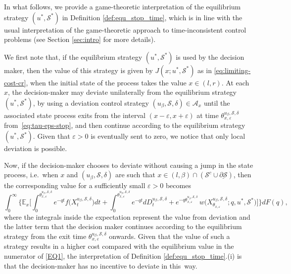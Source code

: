 \documentclass[11pt]{article} %
\numberwithin{komcounter}{section}
\renewcommand{\ul}{\underline}
\renewcommand{\epsilon}{\varepsilon}
\begin{document}
In what follows, we provide a game-theoretic interpretation of the equilibrium strategy $(u^*,\mathcal{S}^*)$ in  Definition \ref{def:equ_stop_time}, which is in line with the usual interpretation of the game-theoretic approach to time-inconsistent control problems (see Section \ref{sec:intro} for more details). 

We first note that, if the equilibrium strategy $(u^*,\mathcal{S}^*)$ is used by the decision maker, then the value of this strategy is given by $J(x; u^*, \mathcal{S}^*)$ as in \eqref{eq:limiting-cost-cr}, when the initial state of the process takes the value $x \in (l,r)$.
At each $x$, the decision-maker may deviate unilaterally from the equilibrium strategy $(u^*,\mathcal{S}^*)$, by  using a deviation control strategy $(u_\beta, \mathcal{S}, \delta)\in \mathcal{A}_{x}$ until the associated state process exits from the interval $(x-\epsilon,x+\epsilon)$ at time $\theta^{u_\beta,\mathcal{S},\delta}_{x,\epsilon}$ from~\eqref{eq:tau-eps-stop}, and then continue according to the equilibrium strategy $(u^*,\mathcal{S}^*)$.
Given that $\epsilon>0$ is eventually sent to zero, we notice that only local deviation is possible. 

Now, if the decision-maker chooses to deviate without causing a jump in the state process, i.e.~when $x$ and $(u_\beta, \mathcal{S}, \delta)$ are such that $x \in (l,\beta) \cap (\mathcal{S}^c \cup \ul{\partial \mathcal{S}})$, then the corresponding value for a sufficiently small $\epsilon>0$ becomes 
$$
\int_0^\infty \bigg\{ 
\mathbb{E}_x \bigg[ \int_{0}^{\theta^{u_\beta,\mathcal{S},\delta}_{x,\epsilon}} e^{-qt} f\big( X_t^{u_\beta,\mathcal{S},\delta} \big) dt + \int_{0}^{\theta^{u_\beta,\mathcal{S},\delta}_{x,\epsilon}} e^{-qt} d D^{u_\beta,\mathcal{S},\delta}_t  + e^{-q \theta^{u_\beta,\mathcal{S},\delta}_{x,\epsilon}} \, w\Big( X^{u_\beta,\mathcal{S},\delta}_{\theta_{x,\epsilon}};q, u^*, \mathcal{S}^* \Big) \bigg] \bigg\} dF(q),
$$
where the integrals inside the expectation represent the value from deviation and the latter term that the decision maker continues according to the equilibrium strategy from the exit time $\theta^{u_\beta,\mathcal{S},\delta}_{x,\epsilon}$ onwards. 
Given that the value of such a strategy results in a higher cost compared with the equilibrium value in the numerator of \eqref{EQ1}, the interpretation of Definition \ref{def:equ_stop_time}.(i) is that the decision-maker has no incentive to deviate in this~way.
\end{document}
